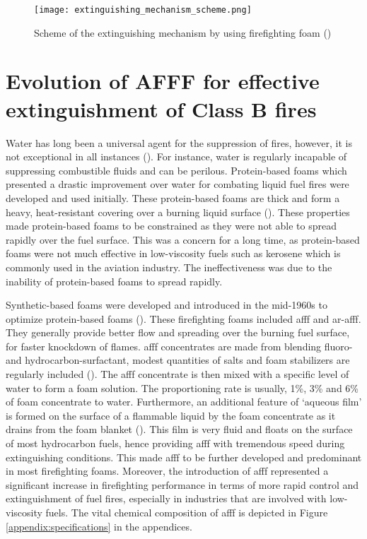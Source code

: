 \begin{figure}[H]
    \centering
    \texttt{[image: extinguishing\_mechanism\_scheme.png]}
    \caption{Scheme of the extinguishing mechanism by using firefighting foam (\cite{turekova2011environmental})}
    \label{ch2:figure:scheme}
\end{figure}

\section{Evolution of AFFF for effective extinguishment of Class B fires}
Water has long been a universal agent for the suppression of fires, however, it is not exceptional in all instances (\cite{hinnant2020characterizing}). For instance, water is regularly incapable of suppressing combustible fluids and can be perilous. Protein-based foams which presented a drastic improvement over water for combating liquid fuel fires were developed and used initially. These protein-based foams are thick and form a heavy, heat-resistant covering over a burning liquid surface (\cite{scheffey1995evaluating}). These properties made protein-based foams to be constrained as they were not able to spread rapidly over the fuel surface. This was a concern for a long time, as protein-based foams were not much effective in low-viscosity fuels such as kerosene which is commonly used in the aviation industry. The ineffectiveness was due to the inability of protein-based foams to spread rapidly. 

Synthetic-based foams were developed and introduced in the mid-1960s to optimize protein-based foams (\cite{aamodt2020review}). These firefighting foams included \acrshort{afff} and \acrshort{ar-afff}. They generally provide better flow and spreading over the burning fuel surface, for faster knockdown of flames. \acrshort{afff} concentrates are made from blending fluoro-and hydrocarbon-surfactant, modest quantities of salts and foam stabilizers are regularly included (\cite{wang2019research}). The \acrshort{afff} concentrate is then mixed with a specific level of water to form a foam solution. The proportioning rate is usually, 1\%, 3\% and 6\% of foam concentrate to water. Furthermore, an additional feature of ‘aqueous film’ is formed on the surface of a flammable liquid by the foam concentrate as it drains from the foam blanket (\cite{hinnant2020characterizing}). This film is very fluid and floats on the surface of most hydrocarbon fuels, hence providing \acrshort{afff} with tremendous speed during extinguishing conditions. This made \acrshort{afff} to be further developed and predominant in most firefighting foams. Moreover, the introduction of \acrshort{afff} represented a significant increase in firefighting performance in terms of more rapid control and extinguishment of fuel fires, especially in industries that are involved with low-viscosity fuels. The vital chemical composition of \acrshort{afff} is depicted in Figure \ref{appendix:specifications} in the appendices. 

